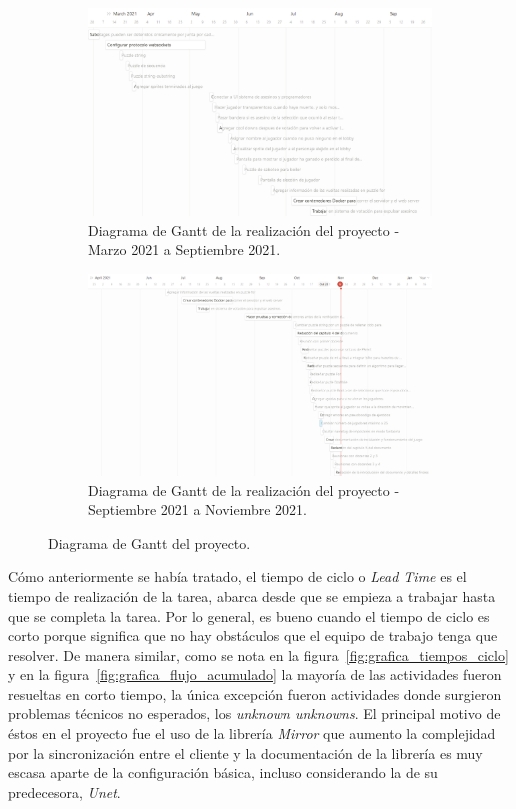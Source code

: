\begin{figure}[H]
    \ContinuedFloat
    \centering
    \begin{subfigure}{\textwidth}
        \centering
        \includegraphics[width=0.8\linewidth]{images/mar-sep-21.png}
        \caption{Diagrama de Gantt de la realización del proyecto - Marzo 2021 a Septiembre 2021.}
        \label{fig:gantt_proyecto_2}
    \end{subfigure}
    \begin{subfigure}{\textwidth}
        \centering
        \includegraphics[width=0.8\linewidth]{images/sep-nov-21.png}
        \caption{Diagrama de Gantt de la realización del proyecto - Septiembre 2021 a Noviembre 2021.}
        \label{fig:gantt_proyecto_3}
    \end{subfigure}
    \caption{Diagrama de Gantt del proyecto.}
    \label{fig:diagrama_gantt}
\end{figure}

Cómo anteriormente se había tratado, el tiempo de ciclo o \textit{Lead Time} es el tiempo de realización de la tarea, abarca desde que se empieza a trabajar hasta que se completa la tarea. Por lo general, es bueno cuando el tiempo de ciclo es corto porque significa que no hay obstáculos que el equipo de trabajo tenga que resolver. De manera similar, como se nota en la figura~\ref{fig:grafica_tiempos_ciclo} y en la figura~\ref{fig:grafica_flujo_acumulado} la mayoría de las actividades fueron resueltas en corto tiempo, la única excepción fueron actividades donde surgieron problemas técnicos no esperados, los \textit{unknown unknowns}. El principal motivo de éstos en el proyecto fue el uso de la librería \textit{Mirror} que aumento la complejidad por la sincronización entre el cliente y la documentación de la librería es muy escasa aparte de la configuración básica, incluso considerando la de su predecesora, \textit{Unet}.


